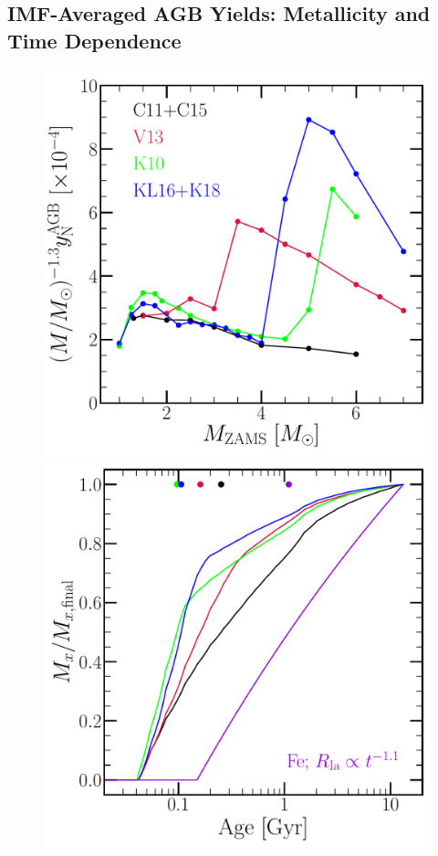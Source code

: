 \documentclass[ms.tex]{subfiles}
\begin{document}
\subsection{IMF-Averaged AGB Yields: Metallicity and Time Dependence} 
\label{sec:yields:imf_agb} 

\begin{figure} 
\centering 
\includegraphics[scale = 0.3]{agb_yield_models_imfweighted.pdf} 
\includegraphics[scale = 0.3]{ssp_production_modelcomp.pdf} 

\end{figure}
\end{document}
